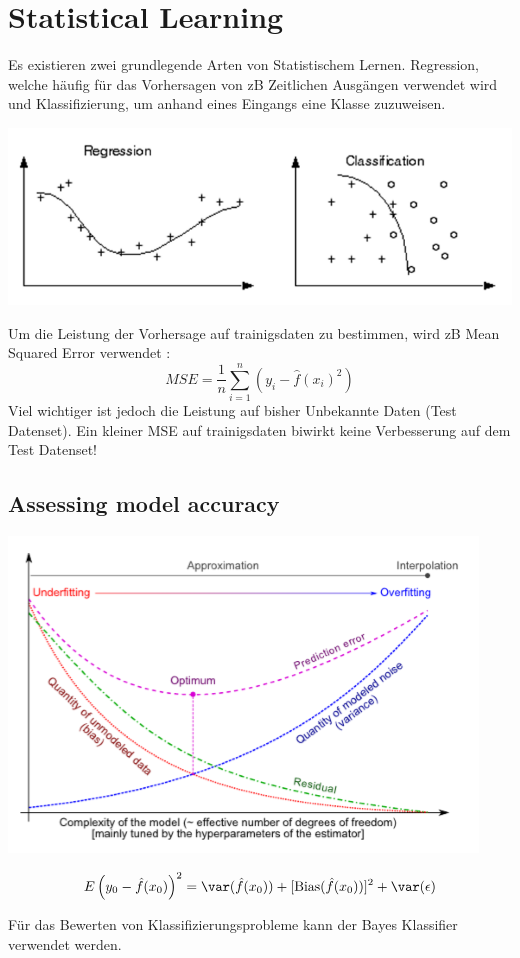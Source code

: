 \section{Statistical Learning}
Es existieren zwei grundlegende Arten von Statistischem Lernen. Regression, welche häufig für das Vorhersagen von zB Zeitlichen Ausgängen verwendet wird und Klassifizierung, um anhand eines Eingangs eine Klasse zuzuweisen.
\begin{center}
	\includegraphics[width=\columnwidth]{./Images/types}
\end{center}

Um die Leistung der Vorhersage auf trainigsdaten zu bestimmen, wird zB Mean Squared Error verwendet :
\[
MSE = \frac{1}{n}\sum_{i=1}^{n}(y_i - \hat{f}(x_i)^2)
\]
Viel wichtiger ist jedoch die Leistung auf bisher Unbekannte Daten (Test Datenset). Ein kleiner MSE auf trainigsdaten biwirkt keine Verbesserung auf dem Test Datenset!


\subsection{Assessing model accuracy}
\begin{center}
	\includegraphics[width=0.8\columnwidth]{"Images/bias vs variance"}
\end{center}
\[
E\left(y_0 - \hat{f}(x_0)\right)^2 = \var(\hat{f}(x_0)) + [\text{Bias}(\hat{f}(x_0))]^2 +\var(\epsilon)
\]

Für das Bewerten von Klassifizierungsprobleme kann der Bayes Klassifier verwendet werden. 
